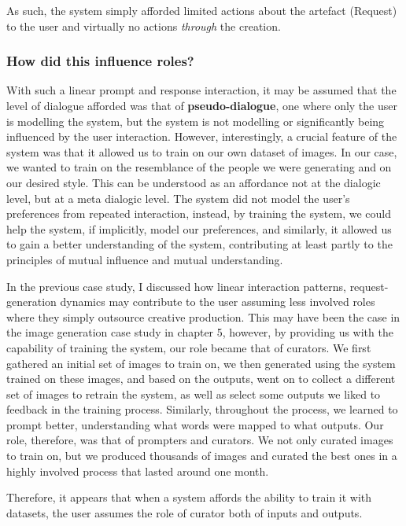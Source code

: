 As such, the system simply afforded limited actions about the artefact (Request) to the user and virtually no actions \textit{through} the creation. 

\subsubsection{How did this influence roles?}

With such a linear prompt and response interaction, it may be assumed that the level of dialogue afforded was that of \textbf{pseudo-dialogue}, one where only the user is modelling the system, but the system is not modelling or significantly being influenced by the user interaction. However, interestingly, a crucial feature of the system was that it allowed us to train on our own dataset of images. In our case, we wanted to train on the resemblance of the people we were generating and on our desired style.  This can be understood as an affordance not at the dialogic level, but at a meta dialogic level. The system did not model the user's preferences from repeated interaction, instead, by training the system, we could help the system, if implicitly, model our preferences, and similarly, it allowed us to gain a better understanding of the system, contributing at least partly to the principles of mutual influence and mutual understanding. 

In the previous case study, I discussed how linear interaction patterns, request-generation dynamics may contribute to the user assuming less involved roles where they simply outsource creative production. This may have been the case in the image generation case study in chapter 5, however, by providing us with the capability of training the system, our role became that of curators. We first gathered an initial set of images to train on, we then generated using the system trained on these images, and based on the outputs, went on to collect a different set of images to retrain the system, as well as select some outputs we liked to feedback in the training process. Similarly, throughout the process, we learned to prompt better, understanding what words were mapped to what outputs. Our role, therefore, was that of prompters and curators. We not only curated images to train on, but we produced thousands of images and curated the best ones in a highly involved process that lasted around one month. 

Therefore, it appears that when a system affords the ability to train it with datasets, the user assumes the role of curator both of inputs and outputs. 


